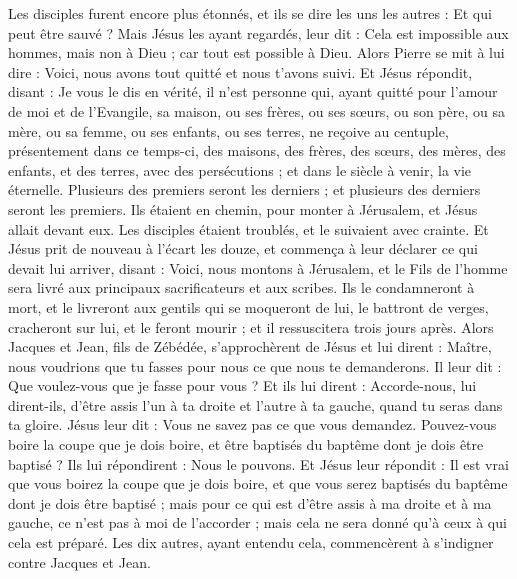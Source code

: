 \begin{multicols}{2}
Les disciples furent encore plus étonnés, et ils se dire les uns les autres : Et qui peut être sauvé ?
Mais Jésus les ayant regardés, leur dit : Cela est impossible aux hommes, mais non à Dieu ; car tout est possible à Dieu.
Alors Pierre se mit à lui dire : Voici, nous avons tout quitté et nous t'avons suivi.
Et Jésus répondit, disant : Je vous le dis en vérité, il n’est personne qui, ayant quitté pour l'amour de moi et de l’Evangile, sa maison, ou ses frères, ou ses sœurs, ou son père, ou sa mère, ou sa femme, ou ses enfants, ou ses terres,
ne reçoive au centuple, présentement dans ce temps-ci, des maisons, des frères, des sœurs, des mères, des enfants, et des terres, avec des persécutions ; et dans le siècle à venir, la vie éternelle.
Plusieurs des premiers seront les derniers ; et plusieurs des derniers seront les premiers.
Ils étaient en chemin, pour monter à Jérusalem, et Jésus allait devant eux. Les disciples étaient troublés, et le suivaient avec crainte. Et Jésus prit de nouveau à l'écart les douze, et commença à leur déclarer ce qui devait lui arriver,
disant : Voici, nous montons à Jérusalem, et le Fils de l'homme sera livré aux principaux sacrificateurs et aux scribes. Ils le condamneront à mort, et le livreront aux gentils
qui se moqueront de lui, le battront de verges, cracheront sur lui, et le feront mourir ; et il ressuscitera trois jours après.
Alors Jacques et Jean, fils de Zébédée, s’approchèrent de Jésus et lui dirent : Maître, nous voudrions que tu fasses pour nous ce que nous te demanderons.
Il leur dit : Que voulez-vous que je fasse pour vous ?
Et ils lui dirent : Accorde-nous, lui dirent-ils, d’être assis l’un à ta droite et l’autre à ta gauche, quand tu seras dans ta gloire.
Jésus leur dit : Vous ne savez pas ce que vous demandez. Pouvez-vous boire la coupe que je dois boire, et être baptisés du baptême dont je dois être baptisé ?
Ils lui répondirent : Nous le pouvons. Et Jésus leur répondit : Il est vrai que vous boirez la coupe que je dois boire, et que vous serez baptisés du baptême dont je dois être baptisé ;
mais pour ce qui est d'être assis à ma droite et à ma gauche, ce n'est pas à moi de l’accorder ; mais cela ne sera donné qu’à ceux à qui cela est préparé.
Les dix autres, ayant entendu cela, commencèrent à s’indigner contre Jacques et Jean.

\end{multicols}
